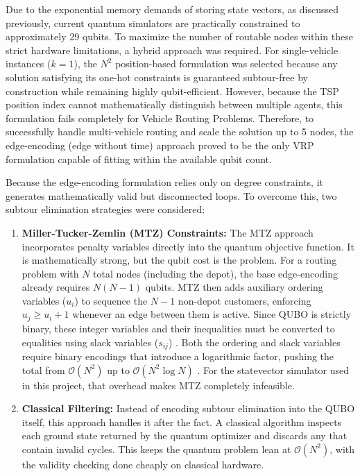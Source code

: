 \documentclass[a4paper]{report}
\begin{document}
{\begin{itemize}
\begin{enumerate}
\end{enumerate}

Due to the exponential memory demands of storing state vectors, as discussed 
previously, current quantum simulators are practically constrained to approximately 
29 qubits. To maximize the number of routable nodes within these strict hardware 
limitations, a hybrid approach was required. For single-vehicle instances ($k=1$), 
the $N^2$ position-based formulation was selected because any solution satisfying 
its one-hot constraints is guaranteed subtour-free by construction while remaining 
highly qubit-efficient.  However, because the TSP position index cannot mathematically distinguish between multiple agents, this formulation fails completely for Vehicle Routing Problems. Therefore, to successfully handle multi-vehicle routing and scale the solution up to 5 nodes, 
the edge-encoding (edge without time) approach proved to be the only VRP formulation 
capable of fitting within the available qubit count.
\newline

Because the edge-encoding formulation relies only on degree constraints, it 
generates mathematically valid but disconnected loops. To overcome this, two 
subtour elimination strategies were considered:

\begin{enumerate}
\item \textbf{Miller-Tucker-Zemlin (MTZ) Constraints: }The MTZ approach incorporates penalty variables directly into the quantum objective function. It is 
mathematically strong, but the qubit cost is the problem. For a routing problem 
with $N$ total nodes (including the depot), the base edge-encoding already 
requires $N(N-1)$ qubits. MTZ then adds auxiliary ordering variables ($u_i$) 
to sequence the $N-1$ non-depot customers, enforcing $u_j \ge u_i + 1$ whenever 
an edge between them is active. Since QUBO is strictly binary, these integer 
variables and their inequalities must be converted to equalities using slack 
variables ($s_{ij}$) \cite{egger2024qaoa}. Both the ordering and slack variables 
require binary encodings that introduce a logarithmic factor, pushing the total 
from $\mathcal{O}(N^2)$ up to $\mathcal{O}(N^2 \log N)$ \cite{bermejo2022gps}. 
For the statevector simulator used in this project, that overhead makes MTZ 
completely infeasible.

    \item \textbf{Classical Filtering:} Instead of encoding subtour elimination 
    into the QUBO itself, this approach handles it after the fact. A classical 
    algorithm inspects each ground state returned by the quantum optimizer and 
    discards any that contain invalid cycles. This keeps the quantum problem 
    lean at $\mathcal{O}(N^2)$, with the validity checking done cheaply on 
    classical hardware. \cite{maciejunes2025solving}
\end{enumerate}


\end{itemize}}
\end{document}
